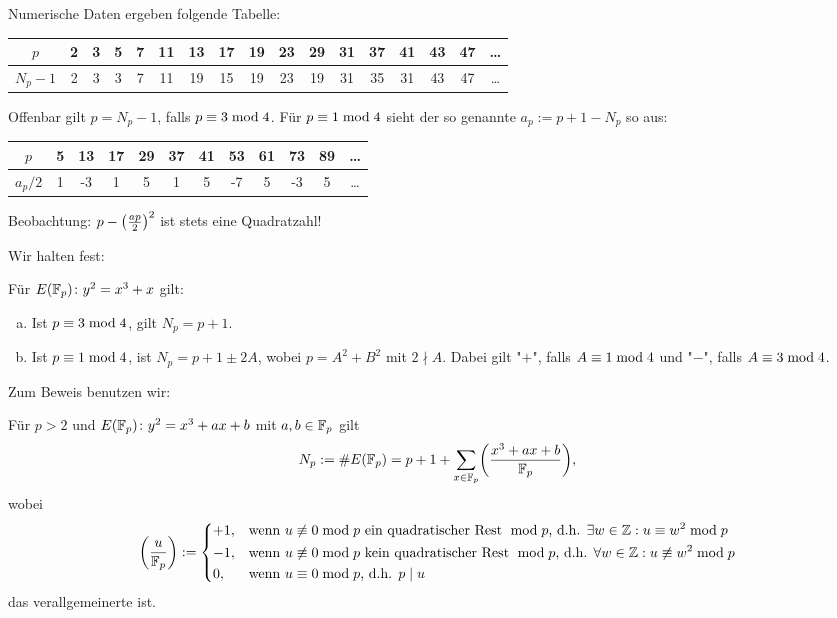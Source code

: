 \begin{defn}[Defekt]
	Numerische Daten ergeben folgende Tabelle:
	\begin{center}
		\begin{tabular}{c||c|c|c|c|c|c|c|c|c|c|c|c|c|c|c|c}
		$p$ & 2 & 3 & 5 & 7 & 11 & 13 & 17 & 19 & 23 & 29 & 31 & 37 & 41 & 43 & 47 & \dots \\ 
		\hline $N_p-1$ & 2 & 3 & 3 & 7 & 11 & 19 & 15 & 19 & 23 & 19 & 31 & 35 & 31 & 43 & 47 & \dots
		\end{tabular} 
	\end{center}
	Offenbar gilt $p = N_p-1$, falls $p \equiv 3 \bmod 4$.
	Für $p \equiv 1 \bmod 4$ sieht der so genannte  $a_p := p+1 - N_p$ so aus:
	\begin{center}
		\begin{tabular}{c||c|c|c|c|c|c|c|c|c|c|c}
		$p$ & 5 & 13 & 17 & 29 & 37 & 41 & 53 & 61 & 73 & 89 & \dots \\ 
		\hline $a_p / 2$ & 1 & -3 & 1 & 5 & 1 & 5 & -7 & 5 & -3 & 5 & \dots 
		\end{tabular} 
	\end{center}
	Beobachtung: $p-\left(\frac{ap}{2}\right)^2$ ist stets eine Quadratzahl!
\end{defn}

Wir halten fest:
\begin{satz}
\label{satz_17.4}
	Für $E(\mathbb{F}_p)\colon y^2 = x^3+x$ gilt:
	\begin{enumerate}[(a)]
		\item Ist $p \equiv 3 \bmod 4$, gilt $N_p = p+1$.
		\item Ist $p \equiv 1 \bmod 4$, ist $N_p = p+1 \pm 2A$, wobei $p = A^2 + B^2$ mit $2 \nmid A$.
		Dabei gilt "$+$", falls $A \equiv 1 \bmod 4$ und "$-$", falls $A \equiv 3 \bmod 4$.
	\end{enumerate}
\end{satz}

Zum Beweis benutzen wir:
\begin{satz}
	Für $p > 2$ und $E(\mathbb{F}_p) \colon y^2 = x^3 + ax + b$ mit $a,b \in \mathbb{F}_p$ gilt
	\[
		N_p := \#E(\FF_p) = p+1+\sum_{x \in \FF_p} \leg{x^3+ax+b}{\FF_p},
	\]
	wobei
	\[
		\left(\frac{u}{\mathbb{F}_p}\right) := \begin{dcases}
			+1, & \text{wenn } u \not\equiv 0 \bmod p \text{ ein quadratischer Rest } \bmod p\text{, d.h. } \exists w \in \mathbb{Z} : u \equiv w^2 \bmod p \\
			-1, & \text{wenn } u \not\equiv 0 \bmod p \text{ kein quadratischer Rest } \bmod p\text{, d.h. } \forall w \in \mathbb{Z} : u \not\equiv w^2 \bmod p \\
			0, & \text{wenn } u \equiv 0 \bmod p\text{, d.h. } p \mid u
		\end{dcases}
	\]
	das verallgemeinerte  ist.
\end{satz}

